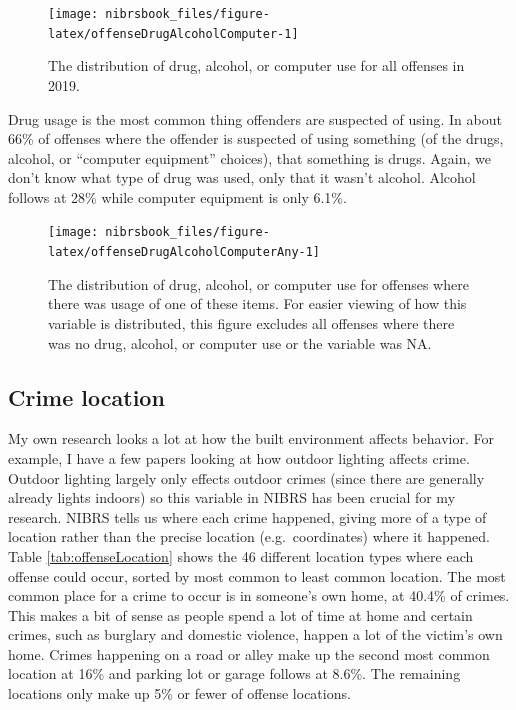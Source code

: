 \documentclass[
  12pt,
  openany]{book}
\begin{document}
\begin{figure}

{\centering \texttt{[image: nibrsbook\_files/figure-latex/offenseDrugAlcoholComputer-1]} 

}

\caption{The distribution of drug, alcohol, or computer use for all offenses in 2019.}\label{fig:offenseDrugAlcoholComputer}
\end{figure}

Drug usage is the most common thing offenders are suspected of using. In about 66\% of offenses where the offender is suspected of using something (of the drugs, alcohol, or ``computer equipment'' choices), that something is drugs. Again, we don't know what type of drug was used, only that it wasn't alcohol. Alcohol follows at 28\% while computer equipment is only 6.1\%.

\begin{figure}

{\centering \texttt{[image: nibrsbook\_files/figure-latex/offenseDrugAlcoholComputerAny-1]} 

}

\caption{The distribution of drug, alcohol, or computer use for offenses where there was usage of one of these items. For easier viewing of how this variable is distributed, this figure excludes all offenses where there was no drug, alcohol, or computer use or the variable was NA.}\label{fig:offenseDrugAlcoholComputerAny}
\end{figure}

\hypertarget{crime-location}{%
\subsection{Crime location}\label{crime-location}}

My own research looks a lot at how the built environment affects behavior. For example, I have a few papers looking at how outdoor lighting affects crime. Outdoor lighting largely only effects outdoor crimes (since there are generally already lights indoors) so this variable in NIBRS has been crucial for my research. NIBRS tells us where each crime happened, giving more of a type of location rather than the precise location (e.g.~coordinates) where it happened. Table \ref{tab:offenseLocation} shows the 46 different location types where each offense could occur, sorted by most common to least common location. The most common place for a crime to occur is in someone's own home, at 40.4\% of crimes. This makes a bit of sense as people spend a lot of time at home and certain crimes, such as burglary and domestic violence, happen a lot of the victim's own home. Crimes happening on a road or alley make up the second most common location at 16\% and parking lot or garage follows at 8.6\%. The remaining locations only make up 5\% or fewer of offense locations.
\end{document}

